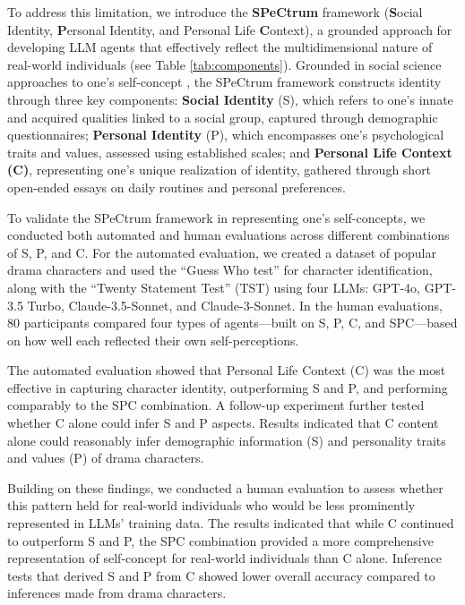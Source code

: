 To address this limitation, we introduce the \textbf{SPeCtrum} framework (\textbf{S}ocial Identity, \textbf{P}ersonal Identity, and Personal Life \textbf{C}ontext), a grounded approach for developing LLM agents that effectively reflect the multidimensional nature of real-world individuals (see Table \ref{tab:components}). Grounded in social science approaches to one's self-concept \citep{Jones2000ACM, mead1934mind}, the SPeCtrum framework constructs identity through three key components: \textbf{Social Identity} (S), which refers to one's innate and acquired qualities linked to a social group, captured through demographic questionnaires; \textbf{Personal Identity} (P), which encompasses one's psychological traits and values,  assessed using established scales; and \textbf{Personal Life Context (C)}, representing one’s unique realization of identity, gathered through short open-ended essays on daily routines and personal preferences. 

To validate the SPeCtrum framework in representing one's self-concepts, we conducted both automated and human evaluations across different combinations of S, P, and C. For the automated evaluation, we created a dataset of popular drama characters and used the ``Guess Who test'' for character identification, along with the ``Twenty Statement Test'' (TST) using four LLMs: GPT-4o, GPT-3.5 Turbo, Claude-3.5-Sonnet, and Claude-3-Sonnet. In the human evaluations, 80 participants compared four types of agents—built on S, P, C, and SPC—based on how well each reflected their own self-perceptions.

The automated evaluation showed that Personal Life Context (C) was the most effective in capturing character identity, outperforming S and P, and performing comparably to the SPC combination. A follow-up experiment further tested whether C alone could infer S and P aspects. Results indicated that C content alone could reasonably infer demographic information (S) and personality traits and values (P) of drama characters.

Building on these findings, we conducted a human evaluation to assess whether this pattern held for real-world individuals who would be less prominently represented in LLMs' training data. The results indicated that while C continued to outperform S and P, the SPC combination provided a more comprehensive representation of self-concept for real-world individuals than C alone. Inference tests that derived S and P from C showed lower overall accuracy compared to inferences made from drama characters.

